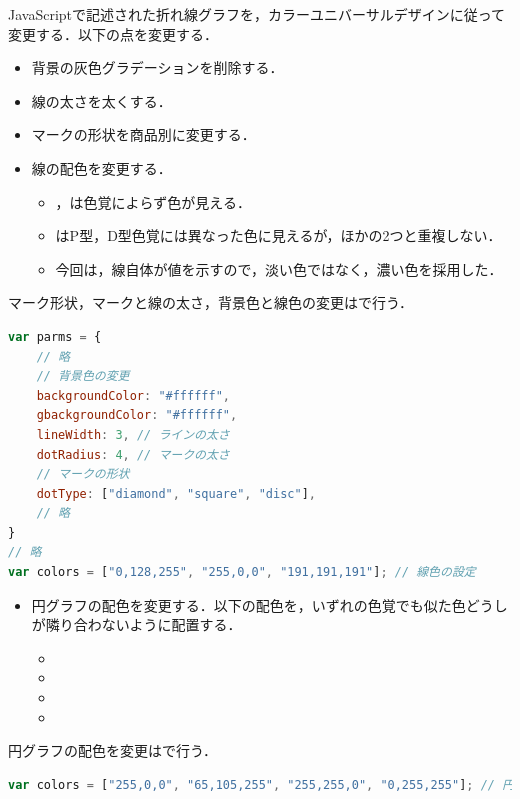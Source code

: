 \par
JavaScriptで記述された折れ線グラフを，カラーユニバーサルデザインに従って変更する．以下の点を変更する．
\begin{itemize}
    \item 背景の灰色グラデーションを削除する．
    \item 線の太さを太くする．
    \item マークの形状を商品別に変更する．
    \item 線の配色を変更する．
          \begin{itemize}
              \item {}，は色覚によらず色が見える．
              \item {}はP型，D型色覚には異なった色に見えるが，ほかの2つと重複しない．
              \item 今回は，線自体が値を示すので，淡い色ではなく，濃い色を採用した．
          \end{itemize}
\end{itemize}
マーク形状，マークと線の太さ，背景色と線色の変更はで行う．
\begin{lstlisting}[caption={折れ線グラフの変更},label={src:折れ線グラフの変更},language={JavaScript}]
var parms = {
    // 略
    // 背景色の変更
    backgroundColor: "#ffffff", 
	gbackgroundColor: "#ffffff",
    lineWidth: 3, // ラインの太さ
    dotRadius: 4, // マークの太さ
    // マークの形状
    dotType: ["diamond", "square", "disc"],
    // 略
}
// 略
var colors = ["0,128,255", "255,0,0", "191,191,191"]; // 線色の設定
\end{lstlisting}
\par
\begin{itemize}
    \item 円グラフの配色を変更する．以下の配色を，いずれの色覚でも似た色どうしが隣り合わないように配置する．
          \begin{itemize}
              \item {}
              \item {}
              \item {}
              \item {}
          \end{itemize}
\end{itemize}
円グラフの配色を変更はで行う．
\begin{lstlisting}[caption={円グラフの変更},label={src:円グラフの変更},language={JavaScript}]
var colors = ["255,0,0", "65,105,255", "255,255,0", "0,255,255"]; // 円色の変更
\end{lstlisting}